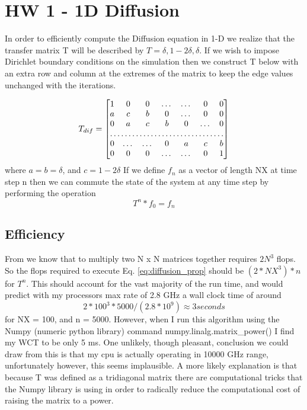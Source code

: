 \documentclass[]{article}
\begin{document}
\section{HW 1 - 1D Diffusion}

In order to efficiently compute the Diffusion equation in 1-D we realize that the transfer matrix T will be described by $T= {\delta, 1-2\delta, \delta}$. If we wish to impose Dirichlet boundary conditions on the simulation then we construct T below with an extra row and column at the extremes of the matrix to keep the edge values unchanged with the iterations.

\begin{equation}
T_{dif}=\begin{bmatrix} 
1       & 0 & 0 &\dots& \dots &0&0 \\
a      & c & b & 0&\dots & 0 &0\\
0& a & c & b & 0 &\dots & 0 \\
\hdotsfor{7} \\
0 &\dots & \dots & 0&a & c & b  \\
0     &0  & 0 & \dots&\dots & 0&1
\end{bmatrix}
\label{eq:T_Diffusion}
\end{equation}
where $a = b =\delta$, and $c=1-2\delta$
If we define $f_n$ as a vector of length NX at time step n then we can commute the state of the system at any time step by performing the operation
\begin{equation}
T^n * f_0 = f_n
\label{eq:diffusion_prop}
\end{equation}


\subsection{Efficiency}
From \cite{matrix_flops} we know that to multiply two N x N matrices together requires $2N^3$ flops. So the flops required to execute Eq. \ref{eq:diffusion_prop} should be $(2*NX^3)*n$ for $T^n$. This should account for the vast majority of the run time, and would predict with my processors max rate of 2.8 GHz a wall clock time of around 
\begin{equation}
	2*100^3*5000 / (2.8 * 10^9) \approx 3 seconds
\end{equation}
for NX = 100, and n = 5000. However, when I run this algorithm using the Numpy (numeric python library) command numpy.linalg.matrix\_power() I find my WCT to be only 5 ms. One unlikely, though pleasant, conclusion we could draw from this is that my cpu is actually operating in 10000 GHz range, unfortunately however, this seems implausible. A more likely explanation is that because T was defined as a tridiagonal matrix there are computational tricks that the Numpy library is using in order to radically reduce the computational cost of raising the matrix to a power. 
\end{document}
